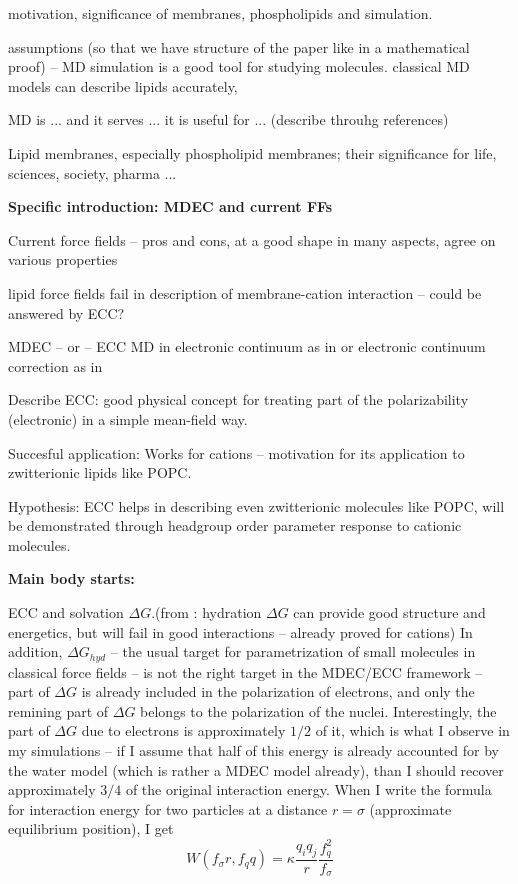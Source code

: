 \documentclass[aip,jcp]{revtex4}
\begin{document}
 motivation, significance of membranes, phospholipids and simulation.

 assumptions (so that we have structure of the paper like in a mathematical proof) -- 
 MD simulation is a good tool for studying molecules.
 classical MD models can describe lipids accurately, 

 MD is ... and it serves ... it is useful for ... (describe throuhg references)

 Lipid membranes, especially phospholipid membranes; their significance for life, sciences, society, pharma ...

\textbf{Specific introduction: MDEC and current FFs}

 Current force fields -- pros and cons, at a good shape in many aspects, agree on various properties

 lipid force fields fail in description of membrane-cation interaction -- could be answered by ECC?

MDEC -- or -- ECC 
MD in electronic continuum as in \cite{Leontyev2015} or electronic continuum correction as in \cite{Jungwirth2015}

Describe ECC: good physical concept for treating part of the polarizability (electronic) in a simple mean-field way.

Succesful application: Works for cations \cite{Jungwirth2015,Kohagen..} -- motivation for its application to zwitterionic lipids like POPC.

Hypothesis: ECC helps in describing even zwitterionic molecules like POPC, will be demonstrated through headgroup order parameter response to cationic molecules.

\textbf{Main body starts:}

ECC and solvation $\Delta G$.(from \cite{Leontyev2015}: hydration $\Delta G$ can provide good structure and energetics, but will fail in good interactions -- already proved for cations)
In addition, $\Delta G_{hyd}$ -- the usual target for parametrization of small molecules in classical force fields -- is not the right target in the MDEC/ECC framework -- part of $\Delta G$ is already included in the polarization of electrons, and only the remining part of $\Delta G$ belongs to the polarization of the nuclei. 
Interestingly, the part of $\Delta G$ due to electrons is approximately $1/2$ of it, which is what I observe in my simulations -- if I assume that half of this energy is already accounted for by the water model (which is rather a MDEC model already), than I should recover approximately $3/4$ of the original interaction energy. 
When I write the formula for interaction energy for two particles at a distance $r=\sigma$ (approximate equilibrium position), I get
\begin{equation}
W(f_\sigma r,f_q q) = \kappa \frac{q_i q_j}{r} \frac{f_q^2}{f_\sigma}
\end{equation}
\end{document}
